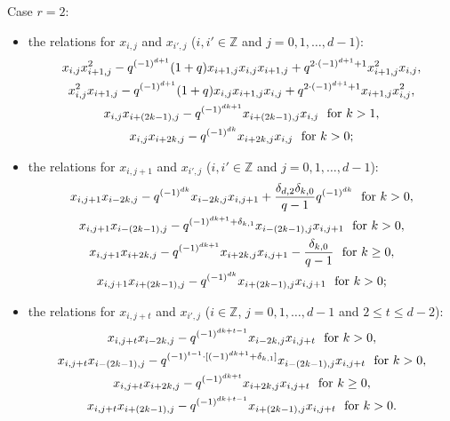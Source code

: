 \documentclass[reqno,12pt,a4paper]{amsart}
\theoremstyle{remark}
\theoremstyle{definition}
\numberwithin{equation}{section}
\begin{document}
\smallskip
\noindent Case $r=2$:
\begin{itemize}
   \item[(1)] the relations for $x_{i,j}$ and $x_{i',j}$ ($i,i'\in\mathbb{Z}$ and $j=0,1,\ldots,d-1$):
  \begin{gather*}
    x_{i,j}x_{i+1,j}^2-q^{(-1)^{d+1}}(1+q)x_{i+1,j}x_{i,j}x_{i+1,j}+q^{2\cdot(-1)^{d+1}+1}x_{i+1,j}^2x_{i,j},\\  
   x_{i,j}^2x_{i+1,j}-q^{(-1)^{d+1}}(1+q)x_{i,j}x_{i+1,j}x_{i,j}+q^{2\cdot(-1)^{d+1}+1}x_{i+1,j}x_{i,j}^2,\\
   x_{i,j}x_{i+(2k-1),j}-q^{(-1)^{dk+1}}x_{i+(2k-1),j}x_{i,j} ~\hbox{ for }k>1,\\
    x_{i,j}x_{i+2k,j}-q^{(-1)^{dk}}x_{i+2k,j}x_{i,j} ~\hbox{ for }k>0;
  \end{gather*}

\item[(2)] the relations for $x_{i,j+1}$ and $x_{i',j}$ ($i,i'\in\mathbb{Z}$ and $j=0,1,\ldots,d-1$):
  \begin{gather*}
  x_{i,j+1}x_{i-2k,j}-q^{(-1)^{dk}}x_{i-2k,j}x_{i,j+1}+\frac{\delta_{d,2}\delta_{k,0}}{q-1}q^{(-1)^{dk}} ~\hbox{ for } k>0,\\
  x_{i,j+1}x_{i-(2k-1),j}-q^{(-1)^{dk+1}+\delta_{k,1}} x_{i-(2k-1),j}x_{i,j+1}~\hbox{ for } k>0,\\
    x_{i,j+1}x_{i+2k,j}-q^{(-1)^{dk+1}}x_{i+2k,j}x_{i,j+1}-\frac{\delta_{k,0}}{q-1} ~\hbox{ for } k\geq0,\\
    x_{i,j+1}x_{i+(2k-1),j}-q^{(-1)^{dk}}x_{i+(2k-1),j}x_{i,j+1} ~\hbox{ for } k>0;
  \end{gather*}

\item[(3)] the relations for $x_{i,j+t}$ and $x_{i',j}$ ($i\in\mathbb{Z}$, $j=0,1,\ldots,d-1$ and $2\leq t\leq d-2$):
  \begin{gather*}
 x_{i,j+t}x_{i-2k,j}-q^{(-1)^{dk+t-1}}x_{i-2k,j}x_{i,j+t} ~\hbox{ for } k>0,\\
  x_{i,j+t}x_{i-(2k-1),j}-q^{(-1)^{t-1}\cdot[(-1)^{dk+1}+\delta_{k,1}]}x_{i-(2k-1),j}x_{i,j+t} ~\hbox{ for } k>0,\\
    x_{i,j+t}x_{i+2k,j}-q^{(-1)^{dk+t}}x_{i+2k,j}x_{i,j+t} ~\hbox{ for } k\geq0,\\
    x_{i,j+t}x_{i+(2k-1),j}-q^{(-1)^{dk+t-1}}x_{i+(2k-1),j}x_{i,j+t} ~\hbox{ for } k>0.
  \end{gather*}

\end{itemize}
\end{document}
